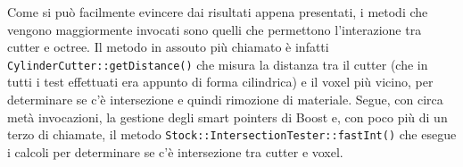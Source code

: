 Come si può facilmente evincere dai risultati appena presentati, i metodi che vengono maggiormente invocati sono quelli che permettono l'interazione tra cutter e octree. Il metodo in assouto più chiamato è infatti \texttt{CylinderCutter::getDistance()} che misura la distanza tra il cutter (che in tutti i test effettuati era appunto di forma cilindrica) e il voxel più vicino, per determinare se c'è intersezione e quindi rimozione di materiale. Segue, con circa metà invocazioni, la gestione degli smart pointers di Boost e, con poco più di un terzo di chiamate, il metodo \texttt{Stock::IntersectionTester::fastInt()} che esegue i calcoli per determinare se c'è intersezione tra cutter e voxel.
